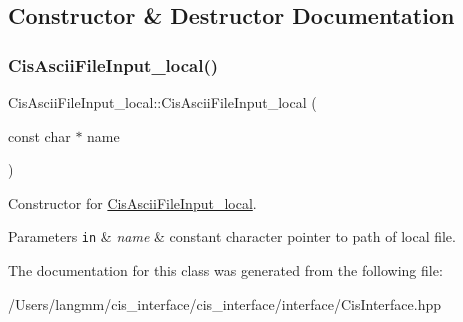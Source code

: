 \subsection{Constructor \& Destructor Documentation}
\mbox{\label{classCisAsciiFileInput__local_a6a503a34514e6c0bd5ba6429393b2629}} 
\subsubsection{\texorpdfstring{Cis\+Ascii\+File\+Input\+\_\+local()}{CisAsciiFileInput\_local()}}
{\footnotesize\ttfamily Cis\+Ascii\+File\+Input\+\_\+local\+::\+Cis\+Ascii\+File\+Input\+\_\+local (\begin{DoxyParamCaption}\item[{const char $\ast$}]{name }\end{DoxyParamCaption})\hspace{0.3cm}{\ttfamily [inline]}}



Constructor for \mbox{\hyperlink{classCisAsciiFileInput__local}{Cis\+Ascii\+File\+Input\+\_\+local}}. 


\begin{DoxyParams}[1]{Parameters}
\mbox{\tt in}  & {\em name} & constant character pointer to path of local file. \\
\hline
\end{DoxyParams}


The documentation for this class was generated from the following file\+:\begin{DoxyCompactItemize}
\item 
/\+Users/langmm/cis\+\_\+interface/cis\+\_\+interface/interface/Cis\+Interface.\+hpp\end{DoxyCompactItemize}
